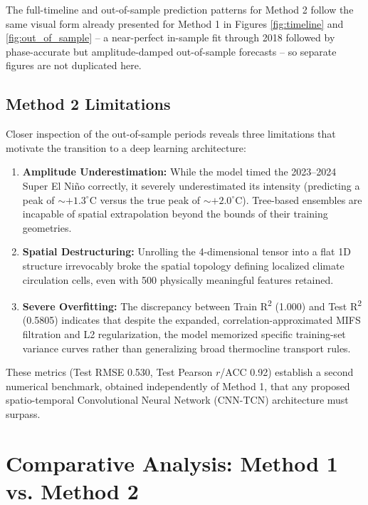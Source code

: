 The full-timeline and out-of-sample prediction patterns for Method 2 follow the same visual form already presented for Method 1 in Figures \ref{fig:timeline} and \ref{fig:out_of_sample} -- a near-perfect in-sample fit through 2018 followed by phase-accurate but amplitude-damped out-of-sample forecasts -- so separate figures are not duplicated here.

\subsection{Method 2 Limitations}
Closer inspection of the out-of-sample periods reveals three limitations that motivate the transition to a deep learning architecture:
\begin{enumerate}
\item \textbf{Amplitude Underestimation:} While the model timed the 2023--2024 Super El Ni\~{n}o correctly, it severely underestimated its intensity (predicting a peak of $\sim +1.3^{\circ}$C versus the true peak of $\sim +2.0^{\circ}$C). Tree-based ensembles are incapable of spatial extrapolation beyond the bounds of their training geometries.
\item \textbf{Spatial Destructuring:} Unrolling the 4-dimensional tensor into a flat 1D structure irrevocably broke the spatial topology defining localized climate circulation cells, even with 500 physically meaningful features retained.
\item \textbf{Severe Overfitting:} The discrepancy between Train R\textsuperscript{2} (1.000) and Test R\textsuperscript{2} (0.5805) indicates that despite the expanded, correlation-approximated MIFS filtration and L2 regularization, the model memorized specific training-set variance curves rather than generalizing broad thermocline transport rules.
\end{enumerate}

These metrics (Test RMSE 0.530, Test Pearson $r$/ACC 0.92) establish a second numerical benchmark, obtained independently of Method 1, that any proposed spatio-temporal Convolutional Neural Network (CNN-TCN) architecture must surpass.

\section{Comparative Analysis: Method 1 vs. Method 2}

